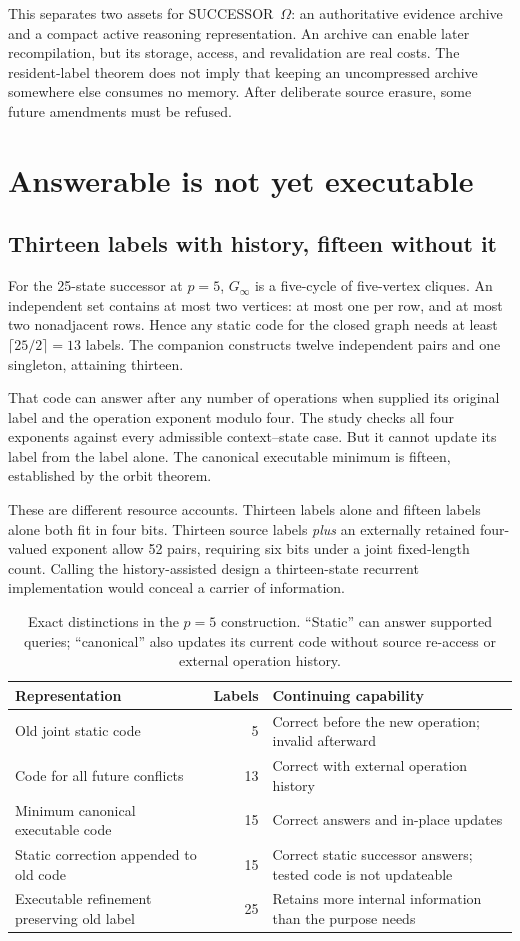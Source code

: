 \documentclass[11pt,letterpaper]{article}
\newcommand{\Om}{SUCCESSOR~$\Omega$}
\theoremstyle{remark}\newtheorem{remark}{Remark}[section]
\begin{document}
This separates two assets for \Om: an authoritative evidence archive and a compact active reasoning representation. An archive can enable later recompilation, but its storage, access, and revalidation are real costs. The resident-label theorem does not imply that keeping an uncompressed archive somewhere else consumes no memory. After deliberate source erasure, some future amendments must be refused.

\section{Answerable is not yet executable}
\label{sec:gap}
\subsection{Thirteen labels with history, fifteen without it}
For the 25-state successor at $p=5$, $G_\infty$ is a five-cycle of five-vertex cliques. An independent set contains at most two vertices: at most one per row, and at most two nonadjacent rows. Hence any static code for the closed graph needs at least $\lceil25/2\rceil=13$ labels. The companion constructs twelve independent pairs and one singleton, attaining thirteen.

That code can answer after any number of operations when supplied its original label and the operation exponent modulo four. The study checks all four exponents against every admissible context--state case. But it cannot update its label from the label alone. The canonical executable minimum is fifteen, established by the orbit theorem.

These are different resource accounts. Thirteen labels alone and fifteen labels alone both fit in four bits. Thirteen source labels \emph{plus} an externally retained four-valued exponent allow 52 pairs, requiring six bits under a joint fixed-length count. Calling the history-assisted design a thirteen-state recurrent implementation would conceal a carrier of information.

\begin{table}[htbp]\centering\small
\caption{Exact distinctions in the $p=5$ construction. ``Static'' can answer supported queries; ``canonical'' also updates its current code without source re-access or external operation history.}\label{tab:frontier}
\begin{tabularx}{\linewidth}{@{}YrY@{}}\toprule
Representation & Labels & Continuing capability\\\midrule
Old joint static code & 5 & Correct before the new operation; invalid afterward\\
Code for all future conflicts & 13 & Correct with external operation history\\
Minimum canonical executable code & 15 & Correct answers and in-place updates\\
Static correction appended to old code & 15 & Correct static successor answers; tested code is not updateable\\
Executable refinement preserving old label & 25 & Retains more internal information than the purpose needs\\\bottomrule
\end{tabularx}
\end{table}
\end{document}
